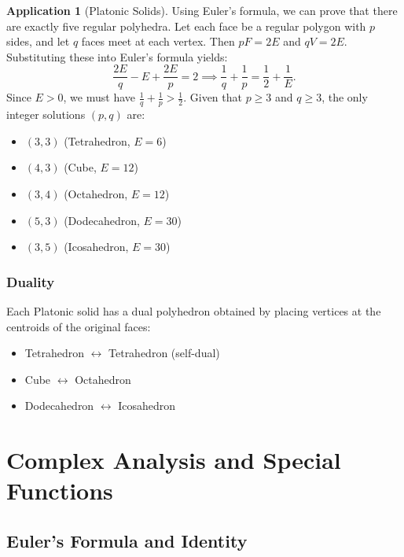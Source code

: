 \documentclass[11pt,a4paper,twoside]{book}
\theoremstyle{eulerstyle}
\theoremstyle{definition}
\newtheorem{application}[theorem]{Application}
\begin{document}
\begin{application}[Platonic Solids]
Using Euler's formula, we can prove that there are exactly five regular polyhedra. Let each face be a regular polygon with $p$ sides, and let $q$ faces meet at each vertex. Then $pF = 2E$ and $qV = 2E$. Substituting these into Euler's formula yields:
\[
\frac{2E}{q} - E + \frac{2E}{p} = 2 \implies \frac{1}{q} + \frac{1}{p} = \frac{1}{2} + \frac{1}{E}.
\]
Since $E > 0$, we must have $\frac{1}{q} + \frac{1}{p} > \frac{1}{2}$. Given that $p \ge 3$ and $q \ge 3$, the only integer solutions $(p, q)$ are:
\begin{itemize}
    \item $(3, 3)$ (Tetrahedron, $E=6$)
    \item $(4, 3)$ (Cube, $E=12$)
    \item $(3, 4)$ (Octahedron, $E=12$)
    \item $(5, 3)$ (Dodecahedron, $E=30$)
    \item $(3, 5)$ (Icosahedron, $E=30$)
\end{itemize}
\end{application}

\section{Duality}
Each Platonic solid has a dual polyhedron obtained by placing vertices at the centroids of the original faces:
\begin{itemize}
    \item Tetrahedron $\leftrightarrow$ Tetrahedron (self-dual)
    \item Cube $\leftrightarrow$ Octahedron
    \item Dodecahedron $\leftrightarrow$ Icosahedron
\end{itemize}

\cleardoublepage

\part{Complex Analysis and Special Functions}
\label{part:complex_analysis}

\chapter{Euler's Formula and Identity}
\label{ch:euler_formula}
\end{document}
